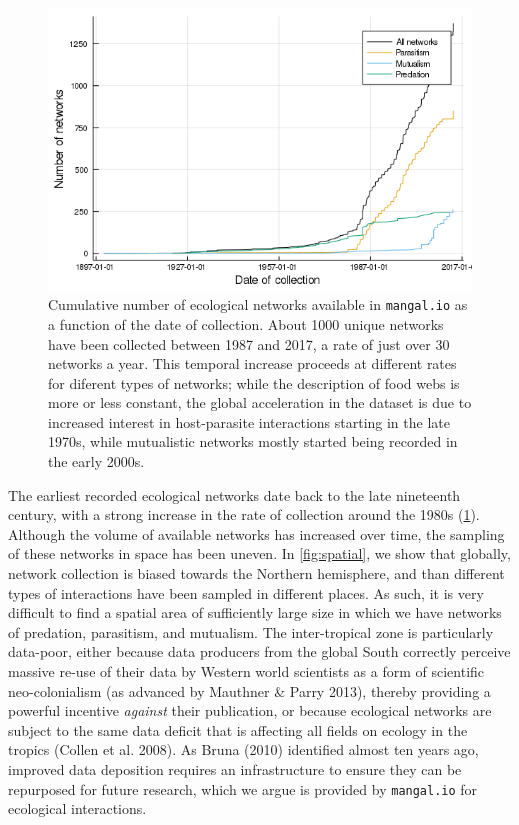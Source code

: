 \begin{figure}
\centering
\includegraphics{figures/figure_01_a.png}
\caption{Cumulative number of ecological networks available in
\texttt{mangal.io} as a function of the date of collection. About 1000
unique networks have been collected between 1987 and 2017, a rate of
just over 30 networks a year. This temporal increase proceeds at
different rates for diferent types of networks; while the description of
food webs is more or less constant, the global acceleration in the
dataset is due to increased interest in host-parasite interactions
starting in the late 1970s, while mutualistic networks mostly started
being recorded in the early 2000s.\label{fig:temporal}}
\end{figure}

The earliest recorded ecological networks date back to the late
nineteenth century, with a strong increase in the rate of collection
around the 1980s (\cref{fig:temporal}). Although the
volume of available networks has increased over time, the sampling of
these networks in space has been uneven. In
\cref{fig:spatial}, we show that globally, network
collection is biased towards the Northern hemisphere, and than different
types of interactions have been sampled in different places. As such, it
is very difficult to find a spatial area of sufficiently large size in
which we have networks of predation, parasitism, and mutualism. The
inter-tropical zone is particularly data-poor, either because data
producers from the global South correctly perceive massive re-use of
their data by Western world scientists as a form of scientific
neo-colonialism (as advanced by Mauthner \& Parry 2013), thereby
providing a powerful incentive \emph{against} their publication, or
because ecological networks are subject to the same data deficit that is
affecting all fields on ecology in the tropics (Collen et al. 2008). As
Bruna (2010) identified almost ten years ago, improved data deposition
requires an infrastructure to ensure they can be repurposed for future
research, which we argue is provided by \texttt{mangal.io} for
ecological interactions.

